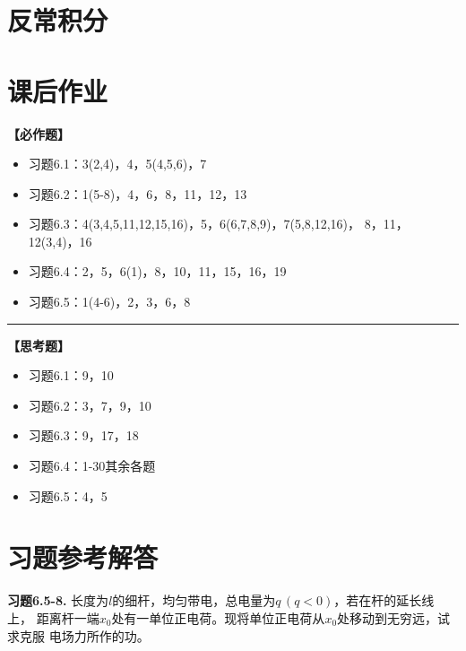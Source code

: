 \section{反常积分}



\newpage

\section*{课后作业}

{\bf 【必作题】}

\begin{itemize}
  \item 习题6.1：3(2,4)，4，5(4,5,6)，7
  \item 习题6.2：1(5-8)，4，6，8，11，12，13
  \item 习题6.3：4(3,4,5,11,12,15,16)，5，6(6,7,8,9)，7(5,8,12,16)，
  8，11，12(3,4)，16
  \item 习题6.4：2，5，6(1)，8，10，11，15，16，19
  \item 习题6.5：1(4-6)，2，3，6，8
\end{itemize}

\bigskip

\hrule

\bigskip
\bigskip

{\bf 【思考题】}

\begin{itemize}
  \item 习题6.1：9，10
  \item 习题6.2：3，7，9，10
  \item 习题6.3：9，17，18
  \item 习题6.4：1-30其余各题
  \item 习题6.5：4，5
\end{itemize}


\newpage

\section*{习题参考解答}

{\bf 习题6.5-8.} 长度为$l$的细杆，均匀带电，总电量为$q\,(q<0)$，若在杆的延长线上，
距离杆一端$x_0$处有一单位正电荷。现将单位正电荷从$x_0$处移动到无穷远，试求克服
电场力所作的功。

